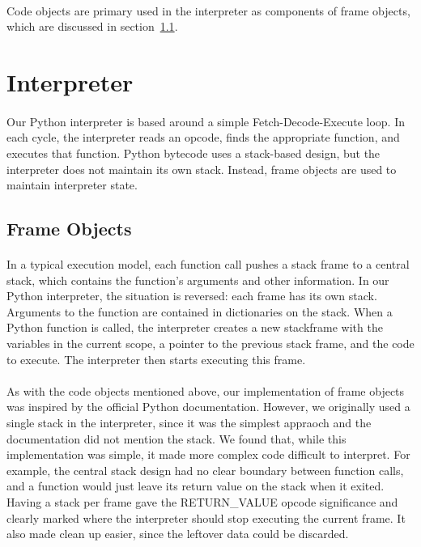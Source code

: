 \documentclass{article}
\begin{document}
\paragraph{}
Code objects are primary used in the interpreter as components of frame objects, which are discussed in section~\ref{py-frameobject}.

\section{Interpreter}\label{interpreter}

\paragraph{}
Our Python interpreter is based around a simple Fetch-Decode-Execute loop. In each cycle, the interpreter reads an opcode, finds the appropriate function, and executes that function. Python bytecode uses a stack-based design, but the interpreter does not maintain its own stack. Instead, frame objects are used to maintain interpreter state.

\subsection{Frame Objects}\label{py-frameobject}
\paragraph{}
In a typical execution model, each function call pushes a stack frame to a central stack, which contains the function's arguments and other information. In our Python interpreter, the situation is reversed: each frame has its own stack. Arguments to the function are contained in dictionaries on the stack. When a Python function is called, the interpreter creates a new stackframe with the variables in the current scope, a pointer to the previous stack frame, and the code to execute. The interpreter then starts executing this frame.

\paragraph{}
As with the code objects mentioned above, our implementation of frame objects was inspired by the official Python documentation. However, we originally used a single stack in the interpreter, since it was the simplest appraoch and the documentation did not mention the stack. We found that, while this implementation was simple, it made more complex code difficult to interpret. For example, the central stack design had no clear boundary between function calls, and a function would just leave its return value on the stack when it exited. Having a stack per frame gave the RETURN\_VALUE opcode significance and clearly marked where the interpreter should stop executing the current frame. It also made clean up easier, since the leftover data could be discarded.
\end{document}
